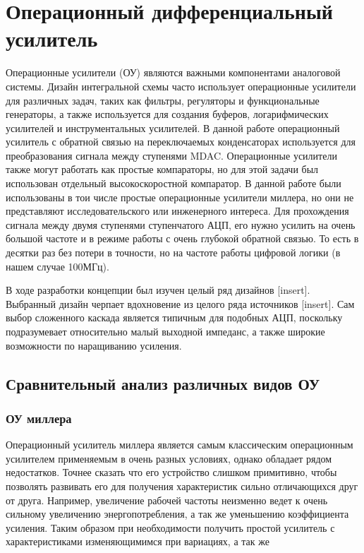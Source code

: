 \documentclass[a4paper,12pt]{article} %
\begin{document}
\section{Операционный дифференциальный усилитель}

Операционные усилители (ОУ) являются важными компонентами аналоговой системы. Дизайн интегральной схемы часто использует операционные усилители для различных задач, таких как фильтры, регуляторы и функциональные генераторы, а также используется для создания буферов, логарифмических усилителей и инструментальных усилителей. В данной работе операционный усилитель с обратной связью на переключаемых конденсаторах используется для преобразования сигнала между ступенями MDAC. Операционные усилители также могут работать как простые компараторы, но для этой задачи был использован отдельный высокоскоростной компаратор. В данной работе были использованы в тои числе простые операционные усилители миллера, но они не представляют исследовательского или инженерного интереса.  Для прохождения сигнала между двумя ступенями ступенчатого АЦП, его нужно усилить на очень большой частоте и в режиме работы с очень глубокой обратной связью. То есть в десятки раз без потери в точности, но на частоте работы цифровой логики (в нашем случае 100МГц).


 В ходе разработки концепции был изучен целый ряд дизайнов [insert]. Выбранный  дизайн черпает вдохновение из целого ряда источников [insert]. Сам выбор сложенного каскада является типичным для подобных АЦП, поскольку подразумевает относительно малый выходной импеданс, а также широкие возможности по наращиванию усиления.  




\subsection{Сравнительный анализ различных видов ОУ}


\subsubsection{ОУ миллера}

Операционный усилитель миллера является самым классическим операционным усилителем применяемым в очень разных условиях, однако обладает рядом недостатков. Точнее сказать что его устройство слишком примитивно, чтобы позволять развивать его для получения характеристик сильно отличающихся друг от друга. Например, увеличение рабочей частоты неизменно ведет к очень сильному увеличению энергопотребления, а так же уменьшению коэффициента усиления. Таким образом при необходимости получить простой усилитель с характеристиками изменяющимимся при вариациях, а так же 
\end{document}
